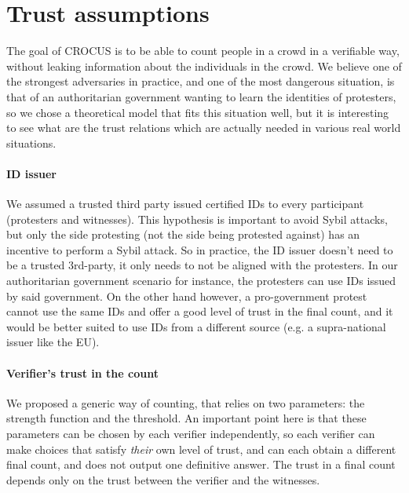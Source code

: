 
\section{Trust assumptions}

The goal of CROCUS is to be able to count people in a crowd in a verifiable way, without leaking information about the individuals in the crowd.
We believe one of the strongest adversaries in practice, and one of the most dangerous situation, is that of an authoritarian government wanting to learn the identities of protesters,
so we chose a theoretical model that fits this situation well, but it is interesting to see what are the trust relations which are actually needed in various real world situations.

\paragraph{ID issuer} We assumed a trusted third party issued certified IDs to every participant (protesters and witnesses). This hypothesis is important to avoid Sybil attacks,
but only the side protesting (not the side being protested against) has an incentive to perform a Sybil attack.
So in practice, the ID issuer doesn't need to be a trusted 3rd-party, it only needs to not be aligned with the protesters.
In our authoritarian government scenario for instance, the protesters can use IDs issued by said government.
On the other hand however, a pro-government protest cannot use the same IDs and offer a good level of trust in the final count, and it would be better suited to use IDs from a different source
(e.g. a supra-national issuer like the EU).

 \paragraph{Verifier's trust in the count} We proposed a generic way of counting, that relies on two parameters: the strength function and the threshold.
An important point here is that these parameters can be chosen by each verifier independently, so each verifier can make choices that satisfy \emph{their} own level of trust, and can each obtain a different final count, and \CROCUS does not output one definitive answer. The trust in a final count depends only on the trust between the verifier and the witnesses.


